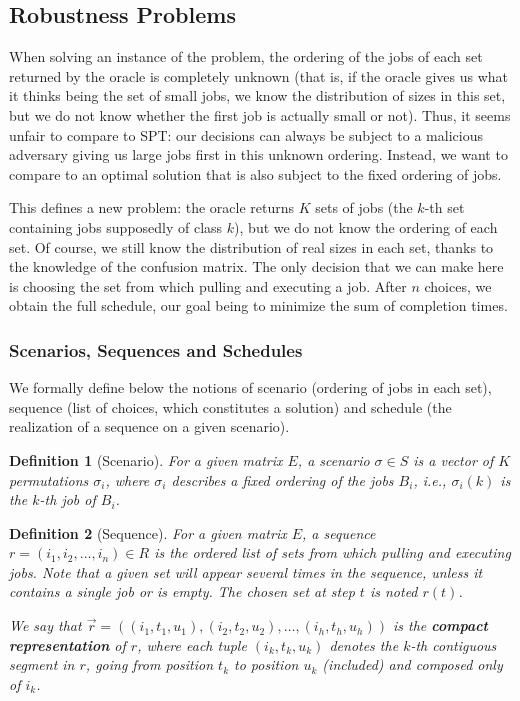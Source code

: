 \documentclass{article}
\newtheorem{definition}{Definition}
\begin{document}
\subsection{Robustness Problems}

When solving an instance of the problem, the ordering of the jobs of each set returned by the oracle is completely unknown (that is, if the oracle gives us what it thinks being the set of small jobs, we know the distribution of sizes in this set, but we do not know whether the first job is actually small or not).
Thus, it seems unfair to compare to SPT: our decisions can always be subject to a malicious adversary giving us large jobs first in this unknown ordering.
Instead, we want to compare to an optimal solution that is also subject to the fixed ordering of jobs.

This defines a new problem: the oracle returns \(K\) sets of jobs (the \(k\)-th set containing jobs supposedly of class \(k\)), but we do not know the ordering of each set.
Of course, we still know the distribution of real sizes in each set, thanks to the knowledge of the confusion matrix.
The only decision that we can make here is choosing the set from which pulling and executing a job.
After \(n\) choices, we obtain the full schedule, our goal being to minimize the sum of completion times.

\subsubsection{Scenarios, Sequences and Schedules}

We formally define below the notions of scenario (ordering of jobs in each set), sequence (list of choices, which constitutes a solution) and schedule (the realization of a sequence on a given scenario).

\begin{definition}[Scenario]
    For a given matrix \(E\), a scenario \(\sigma\in S\) is a vector of \(K\) permutations \(\sigma_i\), where \(\sigma_i\) describes a fixed ordering of the jobs \(B_i\), i.e., \(\sigma_i(k)\) is the \(k\)-th job of \(B_i\).
\end{definition}

\begin{definition}[Sequence]
    For a given matrix \(E\), a sequence \(r=(i_1,i_2,\ldots,i_n)\in R\) is the ordered list of sets from which pulling and executing jobs.
    Note that a given set will appear several times in the sequence, unless it contains a single job or is empty.
    The chosen set at step \(t\) is noted \(r(t)\).

    We say that \(\overrightarrow{r}=((i_1,t_1,u_1),(i_2,t_2,u_2),\ldots,(i_h,t_h,u_h))\) is the \textbf{compact representation} of \(r\), where each tuple \((i_k,t_k,u_k)\) denotes the \(k\)-th contiguous segment in \(r\), going from position \(t_k\) to position \(u_k\) (included) and composed only of \(i_k\).
\end{definition}
\end{document}
